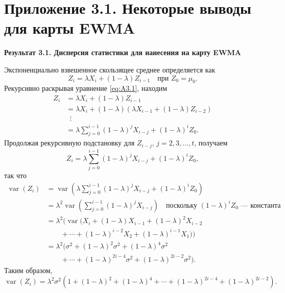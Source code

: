\section*{Приложение 3.1. Некоторые выводы для карты EWMA}

\noindent\textbf{Результат 3.1. Дисперсия статистики для нанесения на карту EWMA}

Экспоненциально взвешенное скользящее среднее определяется как
\begin{equation}
	Z_i = \lambda X_i + (1 - \lambda)Z_{i-1} \quad \text{при } Z_0 = \mu_0.
	\tag{A3.1}
	\label{eq:A3.1}
\end{equation}
Рекурсивно раскрывая уравнение \eqref{eq:A3.1}, находим
\[
\begin{aligned}
	Z_i &= \lambda X_i + (1 - \lambda)Z_{i-1} \\
	    &= \lambda X_i + (1 - \lambda)(\lambda X_{i-1} + (1 - \lambda)Z_{i-2}) \\
	    &\;\;\vdots \\
	    &= \lambda \sum_{j=0}^{i-1}(1 - \lambda)^j X_{i-j} + (1 - \lambda)^i Z_0.
\end{aligned}
\]
Продолжая рекурсивную подстановку для \(Z_{i-j}\), \(j = 2, 3, \ldots, t\), получаем
\begin{equation}
	Z_i = \lambda \sum_{j=0}^{i-1}(1 - \lambda)^j X_{i-j} + (1 - \lambda)^i Z_0,
	\tag{A3.2}
	\label{eq:A3.2}
\end{equation}
так что
\[
\begin{aligned}
	\operatorname{var}(Z_i)
	&= \operatorname{var}\left(\lambda \sum_{j=0}^{i-1}(1 - \lambda)^j X_{i-j} + (1 - \lambda)^i Z_0\right) \\
	&= \lambda^2 \operatorname{var}\left(\sum_{j=0}^{i-1}(1 - \lambda)^j X_{i-j}\right)
	   \quad \text{поскольку } (1 - \lambda)^i Z_0 \text{ — константа} \\
	&= \lambda^2 \big(\operatorname{var}(X_i + (1 - \lambda)X_{i-1} + (1 - \lambda)^2 X_{i-2} \\
	&\qquad + \cdots + (1 - \lambda)^{i-2} X_2 + (1 - \lambda)^{i-1} X_1)\big) \\
	&= \lambda^2 \big(\sigma^2 + (1 - \lambda)^2 \sigma^2 + (1 - \lambda)^4 \sigma^2 \\
	&\qquad + \cdots + (1 - \lambda)^{2i-4}\sigma^2 + (1 - \lambda)^{2i-2}\sigma^2\big).
\end{aligned}
\]
Таким образом,
\begin{equation}
	\operatorname{var}(Z_i) = \lambda^2 \sigma^2 \left(1 + (1 - \lambda)^2 + (1 - \lambda)^4 + \cdots
	+ (1 - \lambda)^{2i-4} + (1 - \lambda)^{2i-2}\right).
	\tag{A3.3}
	\label{eq:A3.3}
\end{equation}
